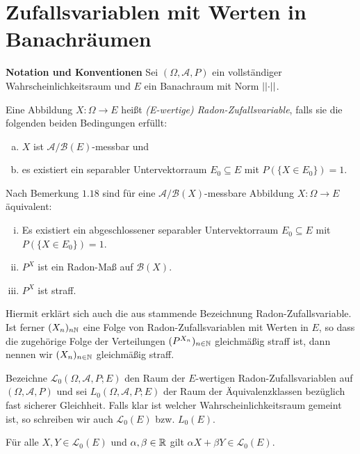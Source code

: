 \section{Zufallsvariablen mit Werten in Banachräumen}
\textbf{Notation und Konventionen} \newline
Sei $(\Omega, \mathcal{A}, P)$ ein vollständiger Wahrscheinlichkeitsraum und $E$ ein Banachraum mit Norm $\lvert\lvert \cdot \rvert\rvert$. 
\begin{mydef}
    Eine Abbildung $X: \Omega \to E$ heißt \textit{(E-wertige) Radon-Zufallsvariable}, falls sie die folgenden beiden Bedingungen erfüllt: 
    \begin{enumerate}[(a)]
        \item $X$ ist $\mathcal{A}/\mathcal{B}(E)$-messbar und
        \item es existiert ein separabler Untervektorraum $E_0 \subseteq E$ mit $P(\{X \in E_0\}) = 1$. 
    \end{enumerate}
\end{mydef}

\begin{remark}
    Nach Bemerkung $1.18$ sind für eine $\mathcal{A}/\mathcal{B}(X)$-messbare Abbildung $X: \Omega \to E$ äquivalent:
    \begin{enumerate}[(i)]
        \item Es existiert ein abgeschlossener separabler Untervektorraum $E_0 \subseteq E$ mit $P(\{X \in E_0\}) = 1$.
        \item $P^X$ ist ein Radon-Maß auf $\mathcal{B}(X)$. 
        \item $P^X$ ist straff. 
    \end{enumerate}
    Hiermit erklärt sich auch die aus \cite{ledoux-talagrand} stammende Bezeichnung Radon-Zufallsvariable. 
    Ist ferner $(X_n)_{n \mathbb{N}}$ eine Folge von Radon-Zufallsvariablen mit Werten in $E$, so dass die zugehörige Folge der Verteilungen $(P^{X_n})_{n \in \mathbb{N}}$ gleichmäßig straff ist, dann nennen wir $(X_n)_{n \in \mathbb{N}}$ gleichmäßig straff. 
\end{remark}

Bezeichne $\mathcal{L}_0(\Omega, \mathcal{A}, P; E)$ den Raum der $E$-wertigen Radon-Zufallsvariablen auf $(\Omega,\mathcal{A},P)$ und sei $L_0(\Omega, \mathcal{A}, P;E)$ der Raum der Äquivalenzklassen bezüglich fast sicherer Gleichheit. 
Falls klar ist welcher Wahrscheinlichkeitsraum gemeint ist, so schreiben wir auch $\mathcal{L}_0(E)$ bzw. $L_0(E)$. 

\begin{proposition}
   Für alle $X,Y \in \mathcal{L}_0(E)$ und $\alpha, \beta \in \mathbb{R}$ gilt $\alpha X + \beta Y \in \mathcal{L}_0(E)$.
\end{proposition}

